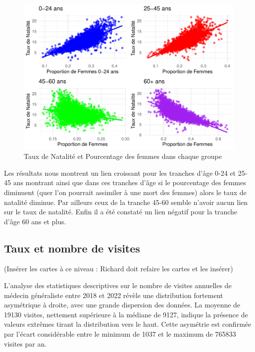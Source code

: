 \documentclass[
]{article}
\begin{document}
\begin{figure}

{\centering \includegraphics{4_Analyse_Descriptive_files/figure-latex/unnamed-chunk-5-1} 

}

\caption{Taux de Natalité et Pourcentage des femmes dans chaque groupe}\label{fig:unnamed-chunk-5}
\end{figure}

Les résultats nous montrent un lien croissant pour les tranches d'âge
0-24 et 25-45 ans montrant ainsi que dans ces tranches d'âge si le
pourcentage des femmes diminuent (quer l'on pourrait assimiler à une
mort des femmes) alors le taux de natalité diminue. Par ailleurs ceux de
la tranche 45-60 semble n'avoir aucun lien sur le taux de natalité.
Enfin il a été constaté un lien négatif pour la tranche d'âge 60 ans et
plus.

\hypertarget{taux-et-nombre-de-visites}{%
\subsection{Taux et nombre de visites}\label{taux-et-nombre-de-visites}}

(Insérer les cartes à ce niveau : Richard doit refaire les cartes et les
insérer)

L'analyse des statistiques descriptives sur le nombre de visites
annuelles de médecin généraliste entre 2018 et 2022 révèle une
distribution fortement asymétrique à droite, avec une grande dispersion
des données. La moyenne de 19130 visites, nettement supérieure à la
médiane de 9127, indique la présence de valeurs extrêmes tirant la
distribution vers le haut. Cette asymétrie est confirmée par l'écart
considérable entre le minimum de 1037 et le maximum de 765833 visites
par an.
\end{document}
